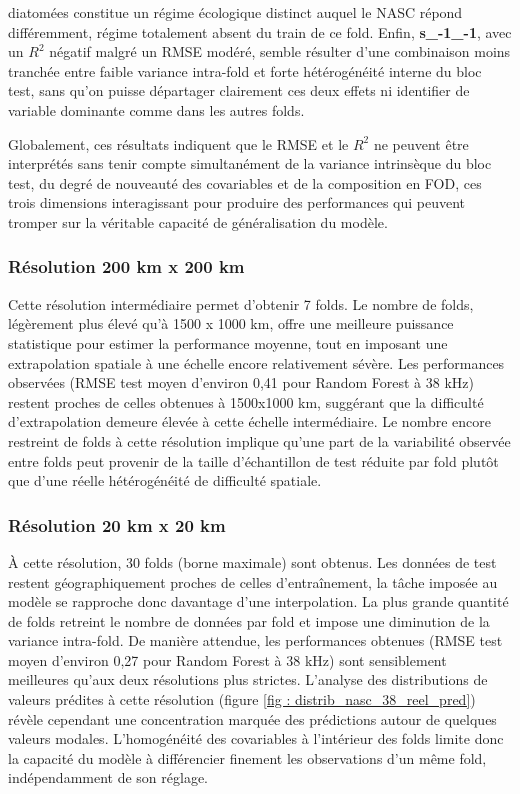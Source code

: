 \documentclass[11pt,a4paper,oneside]{report}
\begin{document}
diatomées constitue un régime écologique distinct auquel le NASC répond différemment, régime totalement absent du train de ce fold. Enfin, \textbf{s\_-1\_-1}, avec un $R^2$ négatif malgré un RMSE modéré, semble résulter d'une combinaison moins tranchée entre faible variance intra-fold et forte hétérogénéité interne du bloc test, sans qu'on puisse départager clairement ces deux effets ni identifier de variable dominante comme dans les autres folds. 
	
	Globalement, ces résultats indiquent que le RMSE et le $R^2$ ne peuvent être interprétés sans tenir compte simultanément de la variance intrinsèque du bloc test, du degré de nouveauté des covariables et de la composition en FOD, ces trois dimensions interagissant pour produire des performances qui peuvent tromper sur la véritable capacité de généralisation du modèle.
	
	
	\subsubsection{Résolution 200 km x 200 km}
	Cette résolution intermédiaire permet d'obtenir 7 folds. Le nombre de folds, légèrement plus élevé qu'à 1500 x 1000 km, offre une meilleure puissance statistique pour estimer la performance moyenne, tout en imposant une extrapolation spatiale à une échelle encore relativement sévère.
	Les performances observées (RMSE test moyen d'environ 0,41 pour Random Forest à 38 kHz) restent proches de celles obtenues à 1500x1000 km, suggérant que la difficulté d'extrapolation demeure élevée à cette échelle intermédiaire. Le nombre encore restreint de folds à cette résolution implique qu'une part de la variabilité observée entre folds peut provenir de la taille d'échantillon de test réduite par fold plutôt que d'une réelle hétérogénéité de difficulté spatiale.
	
	\subsubsection{Résolution 20 km x 20 km}
	À cette résolution, 30 folds (borne maximale) sont obtenus. Les données de test restent géographiquement proches de celles d'entraînement, la tâche imposée au modèle se rapproche donc davantage d'une interpolation. La plus grande quantité de folds retreint le nombre de données par fold et impose une diminution de la variance intra-fold. De manière attendue, les performances obtenues (RMSE test moyen d'environ 0,27 pour Random Forest à 38 kHz) sont sensiblement meilleures qu'aux deux résolutions plus strictes. L'analyse des distributions de valeurs prédites à cette résolution (figure \ref{fig : distrib_nasc_38_reel_pred}) révèle cependant une concentration marquée des prédictions autour de quelques valeurs modales. L'homogénéité des covariables à l'intérieur des folds limite donc la capacité du modèle à différencier finement les observations d'un même fold, indépendamment de son réglage. 
	
\end{document}
